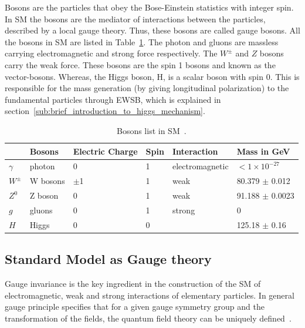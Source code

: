 Bosons are the particles that obey the Bose-Einstein statistics with integer spin. In SM the bosons are the mediator of interactions between the particles, described by a local gauge theory. Thus, these bosons are called gauge bosons. All the bosons in SM are listed in Table~\ref{table:smbosons}.
The photon and gluons are massless carrying electromagnetic and strong force respectively. The $W^{\pm}$ and $Z$ bosons carry the weak force. These bosons are the spin 1 bosons and known as the vector-bosons. Whereas, the Higgs boson, H, is a scalar boson with spin 0. This is responsible for the mass generation (by giving longitudinal polarization) to the fundamental particles through EWSB, which is explained in section~\ref{sub:brief_introduction_to_higgs_mechanism}.

\begin{table}
{\small
\centering
\begin{tabular}[!htbp]{l l l l l l}
\hline
    & \textbf{Bosons} & \textbf{Electric Charge} & \textbf{Spin} & \textbf{Interaction} & \textbf{Mass in GeV} \\
\hline
$\gamma$  & photon   & 0      & 1 & electromagnetic   &   $<1 \times 10^{-27}$ \\
$W^{\pm}$ & W bosons & $\pm$1 & 1 & weak              &  80.379 $\pm$ 0.012    \\
$Z^0$     & Z boson  & 0      & 1 & weak              &  91.188 $\pm$ 0.0023    \\
$g$       & gluons   & 0      & 1 & strong            &  0                     \\
\hline
$H$       & Higgs    & 0      & 0 &                    & 125.18 $\pm$ 0.16     \\
\hline
\end{tabular}
\caption{Bosons list in SM~\cite{PDG2018}.}
\label{table:smbosons}
}
\end{table}

\subsection{Standard Model as Gauge theory}
Gauge invariance is the key ingredient in the construction of the SM of electromagnetic, weak and strong interactions of elementary particles. In general gauge principle specifies that for a given gauge symmetry group and the transformation of the fields, the quantum field theory can be uniquely defined~\cite{Coughlan2006}.

